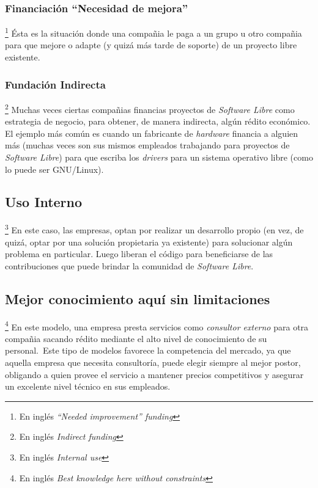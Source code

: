 \subsubsection{Financiaci\'on ``Necesidad de mejora''}\footnote{En ingl\'es
\emph{``Needed improvement'' funding}}
%
\'Esta es la situaci\'on donde una compa\~nia le paga a un grupo u otro
compa\~nia para que mejore o adapte (y quiz\'a m\'as tarde de soporte) de un
proyecto libre existente.

\subsubsection{Fundaci\'on Indirecta}\footnote{En ingl\'es \emph{Indirect
funding}}
%
Muchas veces ciertas compa\~nias financias proyectos de \emph{Software Libre}
como estrategia de negocio, para obtener, de manera indirecta, alg\'un r\'edito
econ\'omico. El ejemplo m\'as com\'un es cuando un fabricante de
\emph{hardware}
financia a alguien m\'as (muchas veces son sus mismos empleados trabajando
para proyectos de \emph{Software Libre}) para que escriba los \emph{drivers}
para un sistema operativo libre (como lo puede ser GNU/Linux). 

\subsection{Uso Interno}\footnote{En ingl\'es \emph{Internal use}}
%
En este caso, las empresas, optan por realizar un desarrollo propio (en vez,
de quiz\'a, optar por una soluci\'on propietaria ya existente) para solucionar
alg\'un problema en particular. Luego liberan el c\'odigo para beneficiarse de
las contribuciones que puede brindar la comunidad de \emph{Software Libre}.

\subsection{Mejor conocimiento aqu\'i sin limitaciones}\footnote{En ingl\'es
\emph{Best knowledge here without constraints}}
%
En este modelo, una empresa presta servicios como \emph{consultor externo} para
otra compa\~nia sacando r\'edito mediante el alto nivel de conocimiento de su
personal.\
Este tipo de modelos favorece la competencia del mercado, ya que aquella
empresa que necesita consultor\'ia, puede elegir siempre al mejor postor,
obligando a quien provee el servicio a mantener precios competitivos y
asegurar un excelente nivel t\'ecnico en sus empleados.\\

